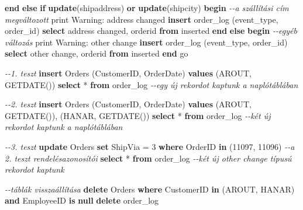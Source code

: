 \documentclass[
  magyar,
]{article}
\newenvironment{Shaded}{}{}
\newcommand{\CommentTok}[1]{\textcolor[rgb]{0.38,0.63,0.69}{\textit{#1}}}
\newcommand{\ControlFlowTok}[1]{\textcolor[rgb]{0.00,0.44,0.13}{\textbf{#1}}}
\newcommand{\DecValTok}[1]{\textcolor[rgb]{0.25,0.63,0.44}{#1}}
\newcommand{\KeywordTok}[1]{\textcolor[rgb]{0.00,0.44,0.13}{\textbf{#1}}}
\newcommand{\NormalTok}[1]{#1}
\newcommand{\OperatorTok}[1]{\textcolor[rgb]{0.40,0.40,0.40}{#1}}
\newcommand{\StringTok}[1]{\textcolor[rgb]{0.25,0.44,0.63}{#1}}
\begin{document}
\begin{Shaded}
\begin{Highlighting}[]
\ControlFlowTok{end} \ControlFlowTok{else} \ControlFlowTok{if} \KeywordTok{update}\NormalTok{(shipaddress) }\KeywordTok{or} \KeywordTok{update}\NormalTok{(shipcity) }\ControlFlowTok{begin}  \CommentTok{{-}{-}a szállítási cím megváltozott}
\NormalTok{    print }\StringTok{\textquotesingle{}Warning: address changed\textquotesingle{}}
    \KeywordTok{insert}\NormalTok{ order\_log (event\_type, order\_id)}
        \KeywordTok{select} \StringTok{\textquotesingle{}address changed\textquotesingle{}}\NormalTok{, orderid }\KeywordTok{from}\NormalTok{ inserted}
\ControlFlowTok{end} \ControlFlowTok{else} \ControlFlowTok{begin}  \CommentTok{{-}{-}egyéb változás}
\NormalTok{    print }\StringTok{\textquotesingle{}Warning: other change\textquotesingle{}}
    \KeywordTok{insert}\NormalTok{ order\_log (event\_type, order\_id)}
        \KeywordTok{select} \StringTok{\textquotesingle{}other change\textquotesingle{}}\NormalTok{, orderid }\KeywordTok{from}\NormalTok{ inserted}
\ControlFlowTok{end}
\NormalTok{go}

\CommentTok{{-}{-}1. teszt}
\KeywordTok{insert}\NormalTok{ Orders (CustomerID, OrderDate) }\KeywordTok{values}\NormalTok{ (}\StringTok{\textquotesingle{}AROUT\textquotesingle{}}\NormalTok{, GETDATE())}
\KeywordTok{select} \OperatorTok{*} \KeywordTok{from}\NormalTok{ order\_log}
\CommentTok{{-}{-}egy új rekordot kaptunk a naplótáblában}

\CommentTok{{-}{-}2. teszt}
\KeywordTok{insert}\NormalTok{ Orders (CustomerID, OrderDate) }\KeywordTok{values}\NormalTok{ (}\StringTok{\textquotesingle{}AROUT\textquotesingle{}}\NormalTok{, GETDATE()), (}\StringTok{\textquotesingle{}HANAR\textquotesingle{}}\NormalTok{, GETDATE())}
\KeywordTok{select} \OperatorTok{*} \KeywordTok{from}\NormalTok{ order\_log}
\CommentTok{{-}{-}két új rekordot kaptunk a naplótáblában}

\CommentTok{{-}{-}3. teszt}
\KeywordTok{update}\NormalTok{ Orders }\KeywordTok{set}\NormalTok{ ShipVia }\OperatorTok{=} \DecValTok{3} \KeywordTok{where}\NormalTok{ OrderID }\KeywordTok{in}\NormalTok{ (}\DecValTok{11097}\NormalTok{, }\DecValTok{11096}\NormalTok{)  }\CommentTok{{-}{-}a 2. teszt rendelésazonosítói}
\KeywordTok{select} \OperatorTok{*} \KeywordTok{from}\NormalTok{ order\_log}
\CommentTok{{-}{-}két új \textquotesingle{}other change\textquotesingle{} típusú rekordot kaptunk}

\CommentTok{{-}{-}táblák visszaállítása}
\KeywordTok{delete}\NormalTok{ Orders }\KeywordTok{where}\NormalTok{ CustomerID }\KeywordTok{in}\NormalTok{ (}\StringTok{\textquotesingle{}AROUT\textquotesingle{}}\NormalTok{, }\StringTok{\textquotesingle{}HANAR\textquotesingle{}}\NormalTok{) }\KeywordTok{and}\NormalTok{ EmployeeID }\KeywordTok{is} \KeywordTok{null}
\KeywordTok{delete}\NormalTok{ order\_log}
\end{Highlighting}
\end{Shaded}
\end{document}
